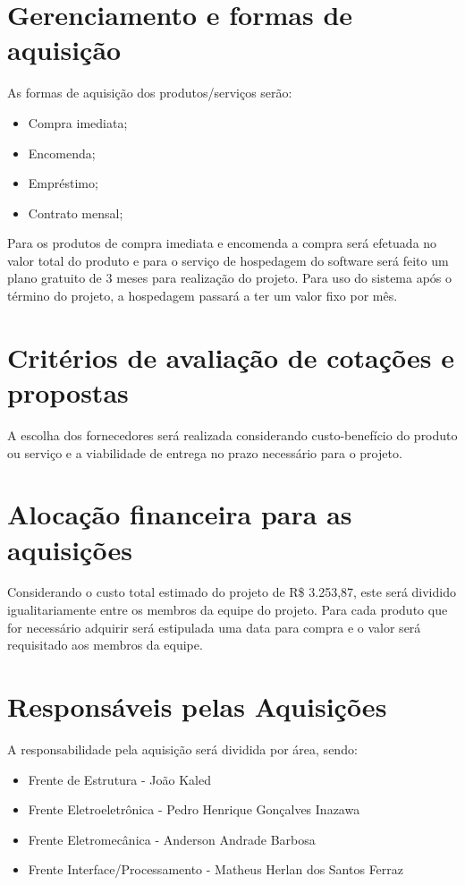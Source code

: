 \section*{Gerenciamento e formas de aquisição}
As formas de aquisição dos produtos/serviços serão:
\begin{itemize}
	\item Compra imediata;
    \item Encomenda;
    \item Empréstimo;
    \item Contrato mensal;
\end{itemize}
Para os produtos de compra imediata e encomenda a compra será efetuada no valor total do produto e para o serviço de hospedagem do software será feito um plano gratuito de 3 meses para realização do projeto. Para uso do sistema após o término do projeto, a hospedagem passará a ter um valor fixo por mês.

\section*{Critérios de avaliação de cotações e propostas}
\label{criterios}
A escolha dos fornecedores será realizada considerando custo-benefício do produto ou serviço e a viabilidade de entrega no prazo necessário para o projeto.   

\section*{Alocação financeira para as aquisições}
Considerando o custo total estimado do projeto de R\$ 3.253,87, este será dividido igualitariamente entre os membros da equipe do projeto. Para cada produto que for necessário adquirir será estipulada uma data para compra e o valor será requisitado aos membros da equipe.

\section*{Responsáveis pelas Aquisições}
A responsabilidade pela aquisição será dividida por área, sendo:

\begin{itemize}
	\item Frente de Estrutura - João Kaled\\
	\item Frente Eletroeletrônica - Pedro Henrique Gonçalves Inazawa\\
	\item Frente Eletromecânica - Anderson Andrade Barbosa\\
	\item Frente Interface/Processamento - Matheus Herlan dos Santos Ferraz\\
\end{itemize}

